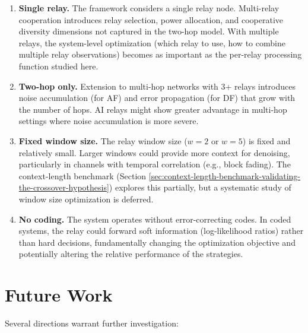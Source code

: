\begin{enumerate}
\item
  \textbf{Single relay.} The framework considers a single relay node. Multi-relay cooperation introduces relay selection, power allocation, and cooperative diversity dimensions not captured in the two-hop model. With multiple relays, the system-level optimization (which relay to use, how to combine multiple relay observations) becomes as important as the per-relay processing function studied here.
\item
  \textbf{Two-hop only.} Extension to multi-hop networks with 3+ relays introduces noise accumulation (for AF) and error propagation (for DF) that grow with the number of hops. AI relays might show greater advantage in multi-hop settings where noise accumulation is more severe.
\item
  \textbf{Fixed window size.} The relay window size (\(w = 2\) or \(w = 5\)) is fixed and relatively small. Larger windows could provide more context for denoising, particularly in channels with temporal correlation (e.g., block fading). The context-length benchmark (Section \ref{sec:context-length-benchmark-validating-the-crossover-hypothesis}) explores this partially, but a systematic study of window size optimization is deferred.
\item
  \textbf{No coding.} The system operates without error-correcting codes. In coded systems, the relay could forward soft information (log-likelihood ratios) rather than hard decisions, fundamentally changing the optimization objective and potentially altering the relative performance of the strategies.
\end{enumerate}

\section{Future Work}\label{sec:future-work}

Several directions warrant further investigation:

